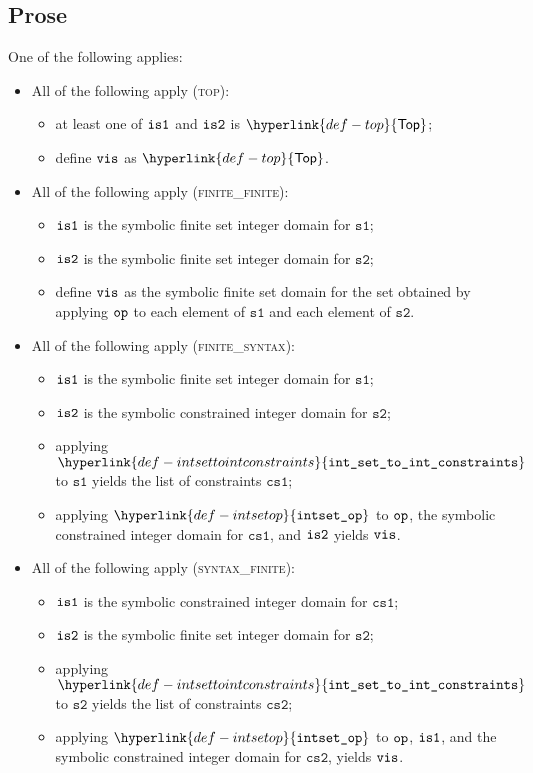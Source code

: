 \documentclass{book}
\newcommand\Top[0]{\hyperlink{def-top}{\textsf{Top}}}
\newcommand\intsetop[0]{\hyperlink{def-intsetop}{\texttt{intset\_op}}}
\newcommand\intsettointconstraints[0]{\hyperlink{def-intsettointconstraints}{\texttt{int\_set\_to\_int\_constraints}}}
\newcommand\vsone[0]{\texttt{s1}}
\newcommand\vstwo[0]{\texttt{s2}}
\newcommand\csone[0]{\texttt{cs1}}
\newcommand\cstwo[0]{\texttt{cs2}}
\begin{document}
\subsection{Prose}
One of the following applies:
\begin{itemize}
  \item All of the following apply (\textsc{top}):
  \begin{itemize}
    \item at least one of $\texttt{is1}$ and $\texttt{is2}$ is $\Top$;
    \item define $\texttt{vis}$ as $\Top$.
  \end{itemize}

  \item All of the following apply (\textsc{finite\_finite}):
  \begin{itemize}
    \item $\texttt{is1}$ is the symbolic finite set integer domain for $\vsone$;
    \item $\texttt{is2}$ is the symbolic finite set integer domain for $\vstwo$;
    \item define $\texttt{vis}$ as the symbolic finite set domain for the set obtained
          by applying $\texttt{op}$ to each element of $\vsone$ and each element of $\vstwo$.
  \end{itemize}

  \item All of the following apply (\textsc{finite\_syntax}):
  \begin{itemize}
    \item $\texttt{is1}$ is the symbolic finite set integer domain for $\vsone$;
    \item $\texttt{is2}$ is the symbolic constrained integer domain for $\vstwo$;
    \item applying $\intsettointconstraints$ to $\vsone$ yields the list of constraints $\csone$;
    \item applying $\intsetop$ to $\texttt{op}$, the symbolic constrained integer domain for $\csone$,
          and $\texttt{is2}$ yields $\texttt{vis}$.
  \end{itemize}

  \item All of the following apply (\textsc{syntax\_finite}):
  \begin{itemize}
    \item $\texttt{is1}$ is the symbolic constrained integer domain for $\csone$;
    \item $\texttt{is2}$ is the symbolic finite set integer domain for $\vstwo$;
    \item applying $\intsettointconstraints$ to $\vstwo$ yields the list of constraints $\cstwo$;
    \item applying $\intsetop$ to $\texttt{op}$, $\texttt{is1}$, and the symbolic constrained integer domain
          for $\cstwo$, yields $\texttt{vis}$.
  \end{itemize}


\end{itemize}
\end{document}
